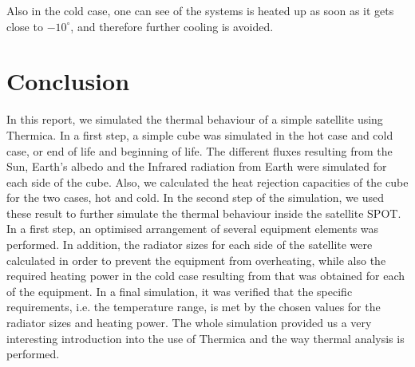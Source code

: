 Also in the cold case, one can see of the systems is heated up as soon as it gets close to $-10^{\circ}$, and therefore further cooling is avoided.

\section{Conclusion}
In this report, we simulated the thermal behaviour of a simple satellite using Thermica. In a first step, a simple cube was simulated in the hot case and cold case, or end of life and beginning of life. The different fluxes resulting from the Sun, Earth's albedo and the Infrared radiation from Earth were simulated for each side of the cube. Also, we calculated the heat rejection capacities of the cube for the two cases, hot and cold.
In the second step of the simulation, we used these result to further simulate the thermal behaviour inside the satellite SPOT. In a first step, an optimised arrangement of several equipment elements was performed. In addition, the radiator sizes for each side of the satellite were calculated in order to prevent the equipment from overheating, while also the required heating power in the cold case resulting from that was obtained for each of the equipment. In a final simulation, it was verified that the specific requirements, i.e. the temperature range, is met by the chosen values for the radiator sizes and heating power. The whole simulation provided us a very interesting introduction into the use of Thermica and the way thermal analysis is performed.
